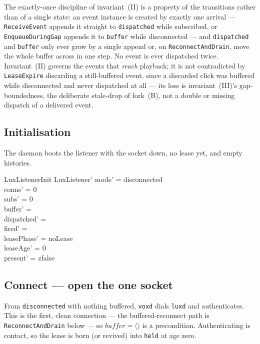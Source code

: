 \documentclass[a4paper,10pt,fleqn]{article}
\begin{document}
The exactly-once discipline of invariant~(II) is a property of the transitions
rather than of a single state: an event instance is created by exactly one
arrival --- \texttt{ReceiveEvent} appends it straight to \texttt{dispatched} while
subscribed, or \texttt{EnqueueDuringGap} appends it to \texttt{buffer} while
disconnected --- and \texttt{dispatched} and \texttt{buffer} only ever grow by a
single append or, on \texttt{ReconnectAndDrain}, move the whole buffer across in
one step. No event is ever dispatched twice. Invariant~(II) governs the events
that \emph{reach} playback; it is not contradicted by \texttt{LeaseExpire}
discarding a still-buffered event, since a discarded click was buffered while
disconnected and never dispatched at all --- its loss is invariant~(III)'s
gap-boundedness, the deliberate stale-drop of fork~(B), not a double or missing
dispatch of a delivered event.

\subsection{Initialisation}

The daemon boots the listener with the socket down, no lease yet, and empty
histories.

\begin{schema}{LuxListenerInit}
  LuxListener'
  \where
  mode' = disconnected \\
  conns' = 0 \\
  subs' = 0 \\
  buffer' = \langle \rangle \\
  dispatched' = \langle \rangle \\
  fired' = \langle \rangle \\
  leasePhase' = noLease \\
  leaseAge' = 0 \\
  present' = zfalse
\end{schema}

\subsection{Connect --- open the one socket}

From \texttt{disconnected} with nothing buffered, \texttt{voxd} dials
\texttt{luxd} and authenticates. This is the first, clean connection --- the
buffered-reconnect path is \texttt{ReconnectAndDrain} below --- so
$buffer = \langle \rangle$ is a precondition. Authenticating is contact, so the
lease is born (or revived) into \texttt{held} at age zero.
\end{document}

